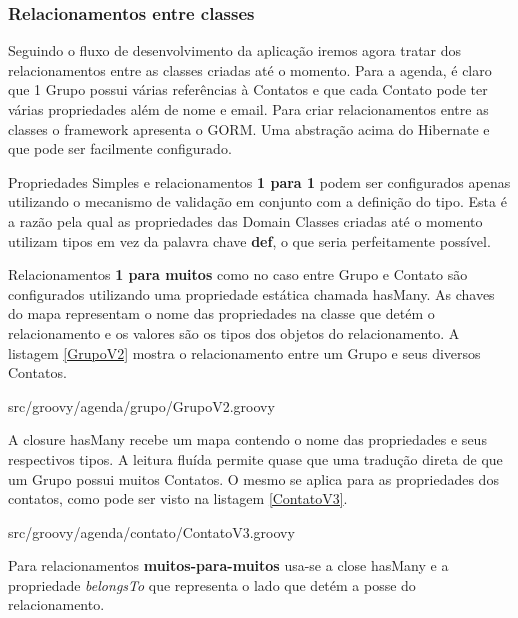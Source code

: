 \documentclass[12pt]{article}
\begin{document}
\subsubsection{Relacionamentos entre classes}
    
    Seguindo o fluxo de desenvolvimento da aplicação iremos agora tratar dos relacionamentos
    entre as classes criadas até o momento. Para a agenda, é claro que 1 Grupo
    possui várias referências à Contatos e que cada Contato pode ter várias propriedades
    além de nome e email. Para criar relacionamentos entre as classes o framework 
    apresenta o GORM. Uma abstração acima do Hibernate e que pode ser facilmente
    configurado.
    
    Propriedades Simples e relacionamentos \textbf{1 para 1} podem ser configurados
    apenas utilizando o mecanismo de validação em conjunto com a definição do tipo.
    Esta é a razão pela qual as propriedades das Domain Classes criadas até o momento
    utilizam tipos em vez da palavra chave \textbf{def}, o que seria perfeitamente
    possível.
    
    Relacionamentos \textbf{1 para muitos} como no caso entre Grupo e Contato são
    configurados utilizando uma propriedade estática chamada hasMany. As chaves
    do mapa representam o nome das propriedades na classe que detém o relacionamento
    e os valores são os tipos dos objetos do relacionamento. A listagem \ref{GrupoV2}
    mostra o relacionamento entre um Grupo e seus diversos Contatos.
    
    
                    {src/groovy/agenda/grupo/GrupoV2.groovy}
    
    A closure hasMany recebe um mapa contendo o nome das propriedades e seus respectivos
    tipos. A leitura fluída permite quase que uma tradução direta de que um Grupo
    possui muitos Contatos. O mesmo se aplica para as propriedades dos contatos, 
    como pode ser visto na listagem \ref{ContatoV3}.
    
    
                    {src/groovy/agenda/contato/ContatoV3.groovy}
    
    Para relacionamentos \textbf{muitos-para-muitos} usa-se a close hasMany e a 
    propriedade \emph{belongsTo} que representa o lado que detém a posse do relacionamento.
    
\end{document}
